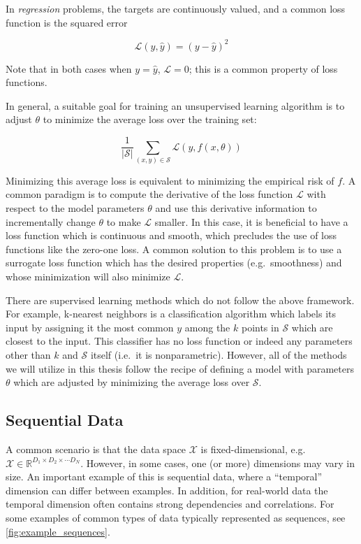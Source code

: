 In {\em regression} problems, the targets are continuously valued, and a common loss function is the squared error

\begin{equation}
\mathcal{L}(y, \hat{y}) = (y - \hat{y})^2
\end{equation}

Note that in both cases when $y = \hat{y}$, $\mathcal{L} = 0$; this is a common property of loss functions.

In general, a suitable goal for training an unsupervised learning algorithm is to adjust $\theta$ to minimize the average loss over the training set:

\begin{equation}
\frac{1}{|\mathcal{S}|} \sum_{(x, y) \in \mathcal{S}} \mathcal{L}(y, f(x, \theta))
\end{equation}

Minimizing this average loss is equivalent to minimizing the empirical risk of $f$.
A common paradigm is to compute the derivative of the loss function $\mathcal{L}$ with respect to the model parameters $\theta$ and use this derivative information to incrementally change $\theta$ to make $\mathcal{L}$ smaller.
In this case, it is beneficial to have a loss function which is continuous and smooth, which precludes the use of loss functions like the zero-one loss.
A common solution to this problem is to use a surrogate loss function which has the desired properties (e.g.\ smoothness) and whose minimization will also minimize $\mathcal{L}$.

There are supervised learning methods which do not follow the above framework.
For example, k-nearest neighbors \cite{cover1967nearest} is a classification algorithm which labels its input by assigning it the most common $y$ among the $k$ points in $\mathcal{S}$ which are closest to the input.
This classifier has no loss function or indeed any parameters other than $k$ and $\mathcal{S}$ itself (i.e.\ it is nonparametric).
However, all of the methods we will utilize in this thesis follow the recipe of defining a model with parameters $\theta$ which are adjusted by minimizing the average loss over $\mathcal{S}$.

\subsection{Sequential Data}

A common scenario is that the data space $\mathcal{X}$ is fixed-dimensional, e.g.\ $\mathcal{X} \in \mathbb{R}^{D_1 \times D_2 \times \cdots D_N}$.
However, in some cases, one (or more) dimensions may vary in size.
An important example of this is sequential data, where a ``temporal'' dimension can differ between examples.
In addition, for real-world data the temporal dimension often contains strong dependencies and correlations.
For some examples of common types of data typically represented as sequences, see \cref{fig:example_sequences}.

